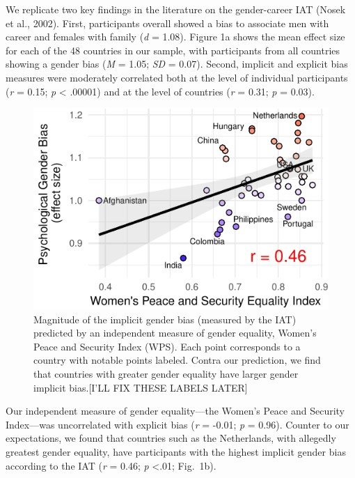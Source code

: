 \documentclass[10pt, letterpaper]{article}
\newenvironment{CodeChunk}{}{}
\begin{document}
We replicate two key findings in the literature on the gender-career IAT
(Nosek et al., 2002). First, participants overall showed a bias to
associate men with career and females with family (\emph{d} = 1.08).
Figure 1a shows the mean effect size for each of the 48 countries in our
sample, with participants from all countries showing a gender bias
(\emph{M} = 1.05; \emph{SD} = 0.07). Second, implicit and explicit bias
measures were moderately correlated both at the level of individual
participants (\emph{r} = 0.15; \emph{p} \textless{} .00001) and at the
level of countries (\emph{r} = 0.31; \emph{p} = 0.03).

\begin{CodeChunk}
\begin{figure}[t]

{\centering \includegraphics{figs/WPS_plot-1} 

}

\caption[Magnitude of the implicit gender bias (measured by the IAT) predicted by an independent measure of gender equality, Women's Peace and Security Index (WPS)]{Magnitude of the implicit gender bias (measured by the IAT) predicted by an independent measure of gender equality, Women's Peace and Security Index (WPS).  Each point corresponds to a country with notable points labeled. Contra our prediction, we find that countries with greater gender equality have larger gender implicit bias.[I'LL FIX THESE LABELS LATER]}\label{fig:WPS_plot}
\end{figure}
\end{CodeChunk}

Our independent measure of gender equality---the Women's Peace and
Security Index---was uncorrelated with explicit bias (\emph{r} = -0.01;
\emph{p} = 0.96). Counter to our expectations, we found that countries
such as the Netherlands, with allegedly greatest gender equality, have
participants with the highest implicit gender bias according to the IAT
(\emph{r} = 0.46; \emph{p} \textless{}.01; Fig.~1b).
\end{document}
